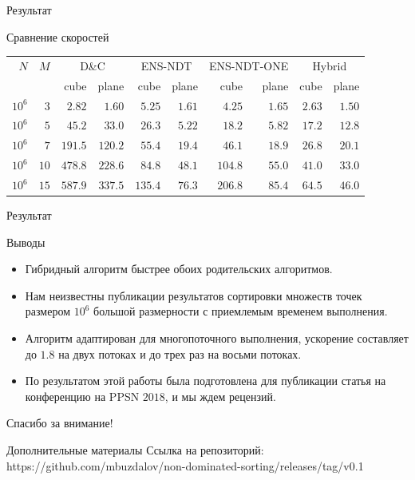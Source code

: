 \documentclass[table]{beamer}
\newcommand{\best}{\cellcolor{gray!50!white}}
\begin{document}
\begin{frame}{Результат}
\begin{block}{Сравнение скоростей}

\begin{center}
\begin{table}[!ht]
\begin{tabular}{rr|rr|rr|rr|rr}
$N$&$M$ & \multicolumn{2}{c|}{D\&C} 
        & \multicolumn{2}{c|}{ENS-NDT} 
        & \multicolumn{2}{c|}{ENS-NDT-ONE} 
        & \multicolumn{2}{c}{Hybrid} \\
& & {\scriptsize cube} & {\scriptsize plane} 
  & {\scriptsize cube} & {\scriptsize plane} 
  & {\scriptsize cube} & {\scriptsize plane} 
  & {\scriptsize cube} & {\scriptsize plane} \\\hline  %
      $10^6$&$3$  & $2.82$ & $1.60$ & $5.25$ & $1.61$ & $4.25$ & $1.65$ & \best $2.63$ & \best$1.50$\\\hline
      $10^6$&$5$  & $45.2$ & $33.0$ & $26.3$ & \best$5.22$ & $18.2$ & $5.82$ & \best $17.2$ & $12.8$\\\hline
      $10^6$&$7$  & $191.5$& $120.2$& $55.4$ & $19.4$ & $46.1$ & \best$18.9$ & \best $26.8$ & $20.1$\\\hline
      $10^6$&$10$ & $478.8$& $228.6$& $84.8$ & $48.1$ & $104.8$& $55.0$ & \best $41.0$ & \best $33.0$\\\hline
      $10^6$&$15$ & $587.9$& $337.5$& $135.4$& $76.3$ & $206.8$& $85.4$ & \best $64.5$ & \best $46.0$\\\hline
\end{tabular}
\end{table}
\end{center}
\end{block}
\end{frame}

\begin{frame}{Результат}
\begin{block}{Выводы}
\begin{itemize}
\item Гибридный алгоритм быстрее обоих родительских алгоритмов.
\item Нам неизвестны публикации результатов сортировки множеств точек размером $10^6$ большой размерности с приемлемым временем выполнения.
\item Алгоритм адаптирован для многопоточного выполнения, ускорение составляет до $1.8$ на двух потоках и до трех раз на восьми потоках.
\item По результатом этой работы была подготовлена для публикации статья на конференцию на PPSN $2018$, и мы ждем рецензий. 
\end{itemize}
\end{block}
\end{frame}

\begin{frame}{}
\begin{center}
Спасибо за внимание!
\end{center}
\end{frame}

\appendix

\begin{frame}{Дополнительные материалы}
Ссылка на репозиторий: https://github.com/mbuzdalov/non-dominated-sorting/releases/tag/v0.1
\end{frame}
\end{document}
